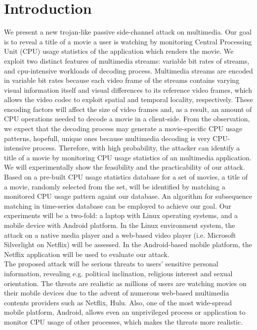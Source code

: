 \section{Introduction}
\label{sec:introduction}
\indent We present a new trojan-like passive side-channel attack on multimedia. Our goal is to reveal a title of a movie a user is watching by monitoring Central Processing Unit (CPU) usage statistics of the application which renders the movie. We exploit two distinct features of multimedia streams: variable bit rates of streams, and cpu-intensive workloads of decoding process. Multimedia streams are encoded in variable bit rates because each video frame of the streams contains varying visual information itself and visual differences to its reference video frames, which allows the video codec to exploit spatial and temporal locality, respectively. These encoding factors will affect the size of video frames and, as a result, an amount of CPU operations needed to decode a movie in a client-side. From the observation, we expect that the decoding process may generate a movie-specific CPU usage patterns, hopefull, unique ones because multimedia decoding is very CPU-intensive process. Therefore, with high probability, the attacker can identify a title of a movie by monitoring CPU usage statistics of an multimedia application.\\
\indent We will experimentally show the feasibility and the practicability of our attack. Based on a pre-built CPU usage statistics database for a set of movies, a title of a movie, randomly selected from the set, will be identified by matching a monitored CPU usage pattern againt our database. An algorithm for subsequence matching in time-series database can be employed to achieve our goal.  Our experiments will be a two-fold: a laptop with Linux operating systems, and a mobile device with Android platform. In the Linux environment system, the attack on a native media player and a web-based video player (i.e. Microsoft Silverlight on Netflix) will be assessed. In the Android-based mobile platform, the Netflix application will be used to evaluate our attack.\\
\indent The proposed attack will be serious threats to users' sensitive personal information, revealing e.g. political inclination, religious interest and sexual orientation. The threats are realistic as millions of users are watching movies on their mobile devices due to the advent of numerous web-based multimedia contents providers such as Netflix, Hulu. Also, one of the most wide-spread mobile platform, Android, allows even an unprivileged process or application to monitor CPU usage of other processes, which makes the threats more realistic. 
